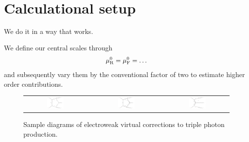 \section{Calculational setup}
\label{sec:setup}

We do it in a way that works.

We define our central scales through
\begin{equation}
  \label{eq:murfdef}
  \begin{split}
    \muR^0 = \muF^0 = \ldots
  \end{split}
\end{equation}
and subsequently vary them by the conventional factor 
of two to estimate higher order contributions.


\begin{figure}[t!]
  \begin{tabular}{ccccc}
    \includegraphics[width=0.288\textwidth]{diagrams/aaa_V_2} & &
    \includegraphics[width=0.288\textwidth]{diagrams/aaa_V_1} & &
    \includegraphics[width=0.288\textwidth]{diagrams/aaa_V_3} \\
  \end{tabular}
  \caption{
    Sample diagrams of electroweak virtual corrections to triple 
    photon production.
  }
\end{figure}

